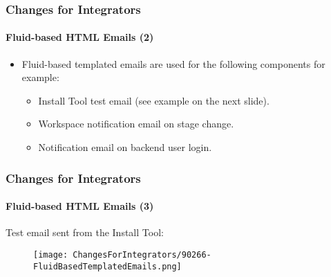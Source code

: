 
\begin{frame}[fragile]
	\frametitle{Changes for Integrators}
	\framesubtitle{Fluid-based HTML Emails (2)}

	\begin{itemize}
		\item Fluid-based templated emails are used for the following components for example:

			\begin{itemize}
				\item Install Tool test email (see example on the next slide).
				\item Workspace notification email on stage change.
				\item Notification email on backend user login.
			\end{itemize}

	\end{itemize}

\end{frame}


\begin{frame}[fragile]
	\frametitle{Changes for Integrators}
	\framesubtitle{Fluid-based HTML Emails (3)}

	Test email sent from the Install Tool:

	\begin{figure}
		\texttt{[image: ChangesForIntegrators/90266-FluidBasedTemplatedEmails.png]}
	\end{figure}

\end{frame}



